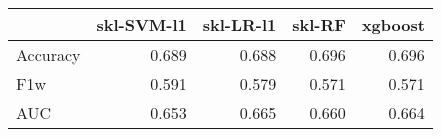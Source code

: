 \begin{tabular}{lrrrr}
\toprule
{} &  skl-SVM-l1 &  skl-LR-l1 &  skl-RF &  xgboost \\
\midrule
Accuracy &       0.689 &      0.688 &   0.696 &    0.696 \\
F1w      &       0.591 &      0.579 &   0.571 &    0.571 \\
AUC      &       0.653 &      0.665 &   0.660 &    0.664 \\
\bottomrule
\end{tabular}
